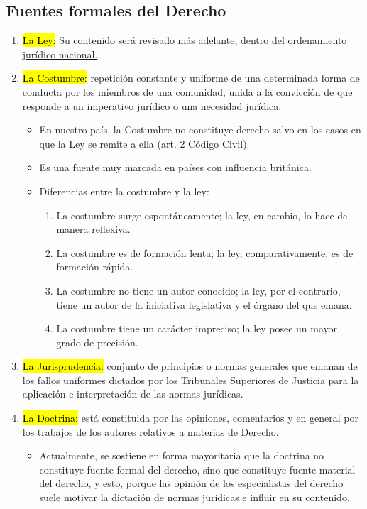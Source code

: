 \documentclass{templateApunte}
\newcommand{\hlcolor}[2]{{\sethlcolor{#1}\hl{#2}}}
\begin{document}
\subsection{Fuentes formales del Derecho}
\begin{enumerate}
  \item \hlcolor{Salmon!60}{La Ley:} \hyperlink{laLey}{Su contenido ser\'a revisado m\'as adelante, dentro del ordenamiento jur\'idico nacional.}
  
  \item \hlcolor{Salmon!60}{La Costumbre:} repetición constante y uniforme de una determinada forma de conducta por los miembros de una comunidad, unida a la convicción de que responde a un imperativo jurídico o una necesidad jurídica.
  \begin{itemize}
    \item En nuestro país, la Costumbre no constituye derecho salvo en los casos en que la Ley se remite a ella (art. 2 Código Civil).
    \item Es una fuente muy marcada en países con influencia británica.
    \item Diferencias entre la costumbre y la ley:
    \begin{enumerate}
      \item La costumbre surge espontáneamente; la ley, en cambio, lo hace de manera reflexiva.
      \item La costumbre es de formación lenta; la ley, comparativamente, es de formación rápida.
      \item La costumbre no tiene un autor conocido; la ley, por el contrario, tiene un autor de la iniciativa legislativa y el órgano del que emana.
      \item La costumbre tiene un carácter impreciso; la ley posee un mayor grado de precisión.
    \end{enumerate}
  \end{itemize}
  
  \item \hlcolor{Salmon!60}{La Jurisprudencia:} conjunto de principios o normas generales que emanan de los fallos uniformes dictados por los Tribunales Superiores de Justicia para la aplicación e interpretación de las normas jurídicas.
  
  \item \hlcolor{Salmon!60}{La Doctrina:} est\'a constituida por las opiniones, comentarios y en general por los trabajos de los autores relativos a materias de Derecho.
  \begin{itemize}
    \item Actualmente, se sostiene en forma mayoritaria que la doctrina no constituye fuente formal del derecho, sino que constituye fuente material del derecho, y esto, porque las opinión de los especialistas del derecho suele motivar la dictaci\'on de normas jurídicas e influir en su contenido.
  \end{itemize}
  

\end{enumerate}
\end{document}
